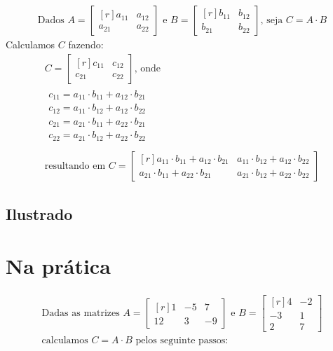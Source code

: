 \Example

\begin{gather*}
    \text{Dados }A=\begin{bmatrix*}[r]
    a_{11} & a_{12} \\ a_{21} & a_{22} 
    \end{bmatrix*} \text{ e }B=\begin{bmatrix*}[r]
    b_{11} & b_{12} \\ b_{21} & b_{22}
    \end{bmatrix*} \text{, seja } C=A \cdot B
\end{gather*}
Calculamos $C$ fazendo:
\begin{gather*}
    C=\begin{bmatrix*}[r]
    c_{11} & c_{12} \\ c_{21} & c_{22}
    \end{bmatrix*}\text{, onde }\\
    \begin{aligned}
        c_{11}=a_{11} \cdot b_{11} + a_{12} \cdot b_{21} \\
        c_{12}=a_{11} \cdot b_{12} + a_{12} \cdot b_{22} \\
        c_{21}=a_{21} \cdot b_{11} + a_{22} \cdot b_{21} \\
        c_{22}=a_{21} \cdot b_{12} + a_{22} \cdot b_{22} \\
    \end{aligned} \\
    \text{resultando em }C=\begin{bmatrix*}[r]
    a_{11} \cdot b_{11} + a_{12} \cdot b_{21} &
    a_{11} \cdot b_{12} + a_{12} \cdot b_{22} \\
    a_{21} \cdot b_{11} + a_{22} \cdot b_{21} &
    a_{21} \cdot b_{12} + a_{22} \cdot b_{22}
    \end{bmatrix*}
\end{gather*}

\subsection{Ilustrado}



\section{Na prática}

\begin{gather*}
    \text{Dadas as matrizes }A=\begin{bmatrix*}[r]
    1 & -5 & 7 \\ 12 & 3 & -9
    \end{bmatrix*} \text{ e }B=\begin{bmatrix*}[r]
    4 & -2 \\ -3 & 1 \\ 2 & 7
    \end{bmatrix*} \\ \text{calculamos }C=A \cdot B \text{ pelos seguinte passos:}
\end{gather*}

